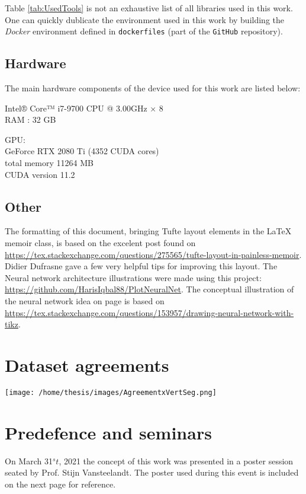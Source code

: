 Table \ref{tab:UsedTools} is not an exhaustive list of all libraries used in this work.
One can quickly dublicate the environment used in this work by building the \textit{Docker} environment defined in \texttt{dockerfiles} (part of the \texttt{GitHub} repository).

\section{Hardware\label{sec:hardware}}
The main hardware components of the device used for this work are listed below:

Intel® Core™ i7-9700 CPU @ 3.00GHz $\times$ 8 \\
RAM : 32 GB

\textsc{GPU}:\\
\hspace{5mm}GeForce RTX 2080 Ti (4352 CUDA cores)\\
\hspace{5mm}total memory 11264 MB\\
\hspace{5mm}CUDA version 11.2



\section{Other}
The formatting of this document, bringing Tufte layout elements in the \LaTeX{} memoir class, is based on the excelent post found on \url{https://tex.stackexchange.com/questions/275565/tufte-layout-in-painless-memoir}.
Didier Dufrasne gave a few very helpful tips for improving this layout.
The Neural network architecture illustrations were made using this project: \url{https://github.com/HarisIqbal88/PlotNeuralNet}.
The conceptual illustration of the neural network idea on page \pageref{fig:ann} is based on \url{https://tex.stackexchange.com/questions/153957/drawing-neural-network-with-tikz}.



\chapter{Dataset agreements\label{seg:datasetagreement}}

\texttt{[image: /home/thesis/images/AgreementxVertSeg.png]}

\chapter{Predefence and seminars}
\par{
  On March 31$^st$, 2021 the concept of this work was presented in a poster session seated by Prof. Stijn Vansteelandt.
The poster used during this event is included on the next page for reference.
}





